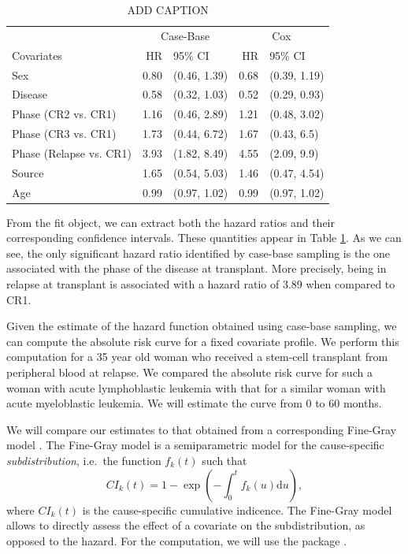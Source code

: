 \documentclass[
]{jss}
\begin{document}
\begin{CodeChunk}
\begin{table}

\caption{\label{tab:bmtcrr-cis}ADD CAPTION}
\centering
\begin{tabular}[t]{lrlrl}
\toprule
\multicolumn{1}{c}{ } & \multicolumn{2}{c}{Case-Base} & \multicolumn{2}{c}{Cox} \\
\cmidrule(l{3pt}r{3pt}){2-3} \cmidrule(l{3pt}r{3pt}){4-5}
Covariates & HR & 95\% CI & HR & 95\% CI\\
\midrule
Sex & 0.80 & (0.46, 1.39) & 0.68 & (0.39, 1.19)\\
Disease & 0.58 & (0.32, 1.03) & 0.52 & (0.29, 0.93)\\
Phase (CR2 vs. CR1) & 1.16 & (0.46, 2.89) & 1.21 & (0.48, 3.02)\\
Phase (CR3 vs. CR1) & 1.73 & (0.44, 6.72) & 1.67 & (0.43, 6.5)\\
Phase (Relapse vs. CR1) & 3.93 & (1.82, 8.49) & 4.55 & (2.09, 9.9)\\
\addlinespace
Source & 1.65 & (0.54, 5.03) & 1.46 & (0.47, 4.54)\\
Age & 0.99 & (0.97, 1.02) & 0.99 & (0.97, 1.02)\\
\bottomrule
\end{tabular}
\end{table}

\end{CodeChunk}

From the fit object, we can extract both the hazard ratios and their
corresponding confidence intervals. These quantities appear in Table
\ref{tab:bmtcrr-cis}. As we can see, the only significant hazard ratio
identified by case-base sampling is the one associated with the phase of
the disease at transplant. More precisely, being in relapse at
transplant is associated with a hazard ratio of 3.89 when compared to
CR1.

Given the estimate of the hazard function obtained using case-base
sampling, we can compute the absolute risk curve for a fixed covariate
profile. We perform this computation for a 35 year old woman who
received a stem-cell transplant from peripheral blood at relapse. We
compared the absolute risk curve for such a woman with acute
lymphoblastic leukemia with that for a similar woman with acute
myeloblastic leukemia. We will estimate the curve from 0 to 60 months.

We will compare our estimates to that obtained from a corresponding
Fine-Gray model \citep{fine1999proportional}. The Fine-Gray model is a
semiparametric model for the cause-specific \emph{subdistribution},
i.e.~the function \(f_k(t)\) such that
\[CI_k(t) =1 - \exp\left( - \int_0^t f_k(u) \textrm{d}u \right),\] where
\(CI_k(t)\) is the cause-specific cumulative indicence. The Fine-Gray
model allows to directly assess the effect of a covariate on the
subdistribution, as opposed to the hazard. For the computation, we will
use the  package \citep{timereg}.
\end{document}
